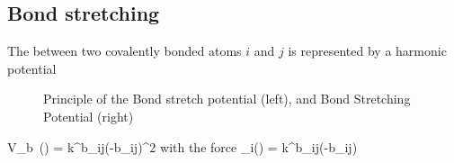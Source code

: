 \subsection{Bond stretching}
The  between two covalently bonded atoms
$i$ and $j$ is represented by a harmonic potential
\begin {figure}[ht]
\centerline{}
\caption{Principle of the Bond stretch potential (left), and Bond
Stretching Potential (right)}
\label{fig:bstretch1}
\end {figure}

\beq
V_b~(\rij) = \half k^b_{ij}(\rij-b_{ij})^2
\eeq
with the force
\beq
{}_i(\rvij)	= k^b_{ij}(\rij-b_{ij}) \rnorm
\eeq

